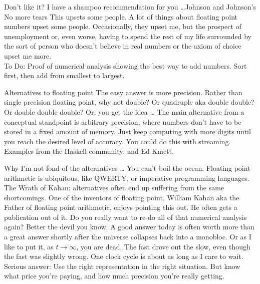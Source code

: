 \documentclass{beamer}
\begin{document}
\begin{frame}{Don't like it? I have a shampoo recommendation for you \ldots Johnson and Johnson's No more tears}
This upsets some people. A lot of things about floating point numbers upset some people. Occasionally, they
upset me, but the prospect of unemployment or, even worse, having to spend the rest of my life surrounded by
the sort of person who doesn't believe in real numbers or the axiom of choice upset me more. \\
To Do: Proof of numerical analysis showing the best way to add numbers. Sort first, then add from smallest to
largest.
\end{frame}

\begin{frame}{Alternatives to floating point}
The easy answer is more precision. Rather than single precision floating point, why not double? Or
quadruple aka double double? Or double double double? Or, you get the idea \ldots
The main alternative from a conceptual standpoint is arbitrary precision, where numbers don't have to be
stored in a fixed amount of memory.
Just keep computing with more digits until you reach the desired level of accuracy. You could do this with
streaming.
Examples from the Haskell community: and Ed Kmett.
\end{frame}

\begin{frame}{Why I'm not fond of the alternatives \ldots}
You can't boil the ocean. Floating point arithmetic is ubiquitous, like QWERTY, or imperative programming
languages.
The Wrath of Kahan: alternatives often end up suffering from the same shortcomings. One of the inventors of
floating point, William Kahan aka the Father of floating point arithmetic, enjoys pointing this out. He often gets a publication out of it.
Do you really want to re-do all of that numerical analysis again? Better the devil you know.
A good answer today is often worth more than a great answer shortly after the universe collapses back into a 
monobloc. Or as I like to put it, as $t \to \infty$, you are dead.
The fast drove out the slow, even though the fast was slightly wrong.
One clock cycle is about as long as I care to wait.
Serious answer: Use the right representation in the right situation. But know what price you're paying, and
how much precision you're really getting.
\end{frame}
\end{document}
